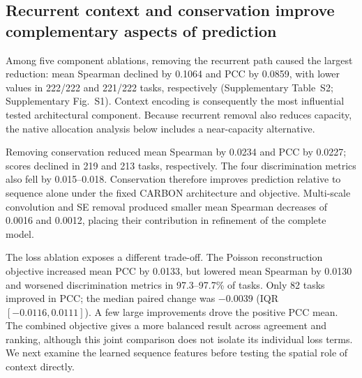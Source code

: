 \documentclass[webpdf,contemporary,large]{oup-authoring-template}
\newcommand{\supfig}[1]{Supplementary Fig.~#1}
\newcommand{\suptab}[1]{Supplementary Table~#1}
\begin{document}
\subsection{Recurrent context and conservation improve complementary aspects of prediction}\label{subsec:ablation}

Among five component ablations, removing the recurrent path caused the largest reduction: mean Spearman declined by 0.1064 and PCC by 0.0859, with lower values in 222/222 and 221/222 tasks, respectively (\suptab{S2}; \supfig{S1}). Context encoding is consequently the most influential tested architectural component. Because recurrent removal also reduces capacity, the native allocation analysis below includes a near-capacity alternative.

Removing conservation reduced mean Spearman by 0.0234 and PCC by 0.0227; scores declined in 219 and 213 tasks, respectively. The four discrimination metrics also fell by 0.015--0.018. Conservation therefore improves prediction relative to sequence alone under the fixed CARBON architecture and objective. Multi-scale convolution and SE removal produced smaller mean Spearman decreases of 0.0016 and 0.0012, placing their contribution in refinement of the complete model.

The loss ablation exposes a different trade-off. The Poisson reconstruction objective increased mean PCC by 0.0133, but lowered mean Spearman by 0.0130 and worsened discrimination metrics in 97.3--97.7\% of tasks. Only 82 tasks improved in PCC; the median paired change was $-0.0039$ (IQR $[-0.0116,0.0111]$). A few large improvements drove the positive PCC mean. The combined objective gives a more balanced result across agreement and ranking, although this joint comparison does not isolate its individual loss terms. We next examine the learned sequence features before testing the spatial role of context directly.
\end{document}

